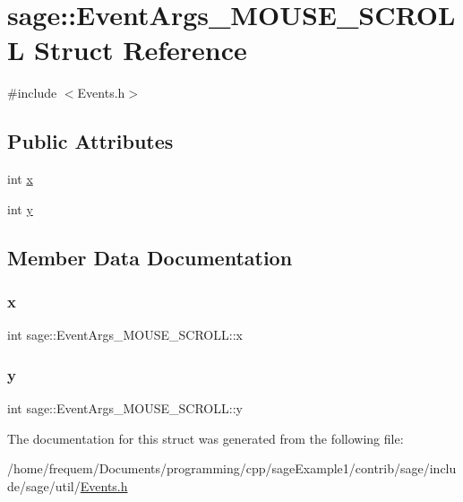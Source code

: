 \hypertarget{structsage_1_1EventArgs__MOUSE__SCROLL}{}\section{sage\+::Event\+Args\+\_\+\+M\+O\+U\+S\+E\+\_\+\+S\+C\+R\+O\+LL Struct Reference}
\label{structsage_1_1EventArgs__MOUSE__SCROLL}


{\ttfamily \#include $<$Events.\+h$>$}

\subsection*{Public Attributes}
\begin{DoxyCompactItemize}
\item 
int \mbox{\hyperlink{structsage_1_1EventArgs__MOUSE__SCROLL_ae122e2108c6e73563578349c1b0797b0}{x}}
\item 
int \mbox{\hyperlink{structsage_1_1EventArgs__MOUSE__SCROLL_a944b5b27d8547a143a8de94493106950}{y}}
\end{DoxyCompactItemize}


\subsection{Member Data Documentation}
\mbox{\label{structsage_1_1EventArgs__MOUSE__SCROLL_ae122e2108c6e73563578349c1b0797b0}} 
\subsubsection{\texorpdfstring{x}{x}}
{\footnotesize\ttfamily int sage\+::\+Event\+Args\+\_\+\+M\+O\+U\+S\+E\+\_\+\+S\+C\+R\+O\+L\+L\+::x}

\mbox{\label{structsage_1_1EventArgs__MOUSE__SCROLL_a944b5b27d8547a143a8de94493106950}} 
\subsubsection{\texorpdfstring{y}{y}}
{\footnotesize\ttfamily int sage\+::\+Event\+Args\+\_\+\+M\+O\+U\+S\+E\+\_\+\+S\+C\+R\+O\+L\+L\+::y}



The documentation for this struct was generated from the following file\+:\begin{DoxyCompactItemize}
\item 
/home/frequem/\+Documents/programming/cpp/sage\+Example1/contrib/sage/include/sage/util/\mbox{\hyperlink{Events_8h}{Events.\+h}}\end{DoxyCompactItemize}
